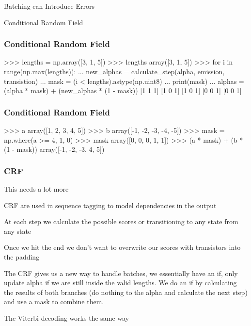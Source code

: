 \documentclass{beamer}
\begin{document}
\begin{section}{Batching can Introduce Errors}
\begin{subsection}{Conditional Random Field}
\begin{frame}
        \end{frame}

\begin{frame}[fragile]
    \frametitle{Conditional Random Field}
    \begin{pythoncode}
>>> lengths = np.array([3, 1, 5])
>>> lengths
array([3, 1, 5])
>>> for i in range(np.max(lengths)):
...     new_alphas = calculate_step(alpha, emission, transistion)
...     mask = (i < lengths).astype(np.uint8)
...     print(mask)
...     alphas = (alpha * mask) + (new_alphas * (1 - mask))
[1 1 1]
[1 0 1]
[1 0 1]
[0 0 1]
[0 0 1]
    \end{pythoncode}
\end{frame}

\begin{frame}[fragile]
    \frametitle{Conditional Random Field}
    \begin{pythoncode}
        >>> a
        array([1, 2, 3, 4, 5])
        >>> b
        array([-1, -2, -3, -4, -5])
        >>> mask = np.where(a >= 4, 1, 0)
        >>> mask
        array([0, 0, 0, 1, 1])
        >>> (a * mask) + (b * (1 - mask))
        array([-1, -2, -3,  4,  5])
    \end{pythoncode}
\end{frame}

        \begin{frame}
            \frametitle{CRF}

            This needs a lot more

            CRF are used in sequence tagging to model dependencies in the output

            At each step we calculate the possible scores or transitioning to any state from any state

            Once we hit the end we don't want to overwrite our scores with transistors into the padding

            The CRF gives us a new way to handle batches, we essentially have an if, only update alpha if we are still
            inside the valid lengths. We do an if by calculating the results of both branches (do nothing to the alpha
            and calculate the next step) and use a mask to combine them.

            The Viterbi decoding works the same way

        \end{frame}

    \end{subsection} %


\end{section}
\end{document}
